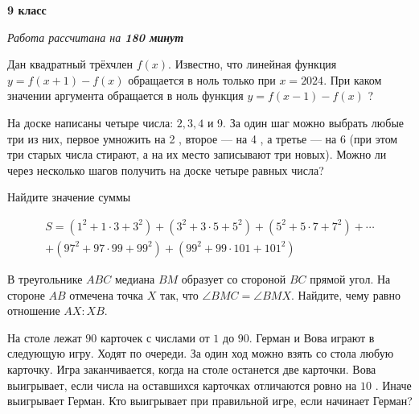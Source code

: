 \centerline{\bf \huge 9 класс}
\centerline{\normalsize{\it Работа рассчитана на \bf{180} минут}}

Дан квадратный трёхчлен $f(x)$. Известно, что линейная функция $y= f(x+1)-f(x)$ обращается в ноль только при $x=2024$. При каком значении аргумента обращается в ноль функция $y=f(x-1)-f(x)$ ?

На доске написаны четыре числа: $2,3,4$ и 9. За один шаг можно выбрать любые три из них, первое умножить на 2 , второе --- на 4 , а третье --- на 6 (при этом три старых числа стирают, а на их место записывают три новых). Можно ли через несколько шагов получить на доске четыре равных числа?

Найдите значение суммы

$$
\begin{gathered}
S=\left(1^2+1 \cdot 3+3^2\right)+\left(3^2+3 \cdot 5+5^2\right)+\left(5^2+5 \cdot 7+7^2\right)+\cdots \\
+\left(97^2+97 \cdot 99+99^2\right)+\left(99^2+99 \cdot 101+101^2\right)
\end{gathered}
$$


В треугольнике $A B C$ медиана $B M$ образует со стороной $B C$ прямой угол. На стороне $A B$ отмечена точка $X$ так, что $\angle B M C=\angle B M X$. Найдите, чему равно отношение $A X: X B$.

На столе лежат $90$ карточек с числами от $1$ до $90$. Герман и Вова играют в следующую игру. Ходят по очереди. За один ход можно взять со стола любую карточку. Игра заканчивается, когда на столе останется две карточки. Вова выигрывает, если числа на оставшихся карточках отличаются ровно на $10$ . Иначе выигрывает Герман. Кто выигрывает при правильной игре, если начинает Герман?